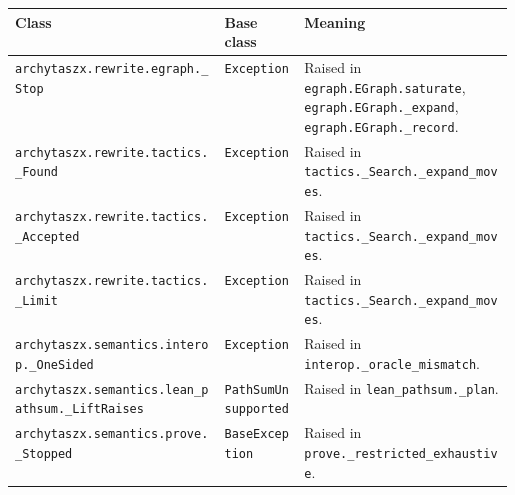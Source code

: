 {\small
\begin{xltabular}{\linewidth}{@{}>{\raggedright\arraybackslash}p{0.42\linewidth}>{\raggedright\arraybackslash}p{0.16\linewidth}X@{}}
\toprule
Class & Base class & Meaning \\
\midrule

\texttt{archytaszx.\allowbreak{}rewrite.\allowbreak{}egraph.\allowbreak{}\_\allowbreak{}Stop} & \texttt{Exception} & Raised in \texttt{egraph.\allowbreak{}EGraph.\allowbreak{}saturate}, \texttt{egraph.\allowbreak{}EGraph.\allowbreak{}\_\allowbreak{}expand}, \texttt{egraph.\allowbreak{}EGraph.\allowbreak{}\_\allowbreak{}record}. \\
\texttt{archytaszx.\allowbreak{}rewrite.\allowbreak{}tactics.\allowbreak{}\_\allowbreak{}Found} & \texttt{Exception} & Raised in \texttt{tactics.\allowbreak{}\_\allowbreak{}Search.\allowbreak{}\_\allowbreak{}expand\_\allowbreak{}moves}. \\
\texttt{archytaszx.\allowbreak{}rewrite.\allowbreak{}tactics.\allowbreak{}\_\allowbreak{}Accepted} & \texttt{Exception} & Raised in \texttt{tactics.\allowbreak{}\_\allowbreak{}Search.\allowbreak{}\_\allowbreak{}expand\_\allowbreak{}moves}. \\
\texttt{archytaszx.\allowbreak{}rewrite.\allowbreak{}tactics.\allowbreak{}\_\allowbreak{}Limit} & \texttt{Exception} & Raised in \texttt{tactics.\allowbreak{}\_\allowbreak{}Search.\allowbreak{}\_\allowbreak{}expand\_\allowbreak{}moves}. \\
\texttt{archytaszx.\allowbreak{}semantics.\allowbreak{}interop.\allowbreak{}\_\allowbreak{}OneSided} & \texttt{Exception} & Raised in \texttt{interop.\allowbreak{}\_\allowbreak{}oracle\_\allowbreak{}mismatch}. \\
\texttt{archytaszx.\allowbreak{}semantics.\allowbreak{}lean\_\allowbreak{}pathsum.\allowbreak{}\_\allowbreak{}LiftRaises} & \texttt{PathSum\-Unsupported} & Raised in \texttt{lean\_\allowbreak{}pathsum.\allowbreak{}\_\allowbreak{}plan}. \\
\texttt{archytaszx.\allowbreak{}semantics.\allowbreak{}prove.\allowbreak{}\_\allowbreak{}Stopped} & \texttt{BaseException} & Raised in \texttt{prove.\allowbreak{}\_\allowbreak{}restricted\_\allowbreak{}exhaustive}. \\
\bottomrule
\end{xltabular}
}
